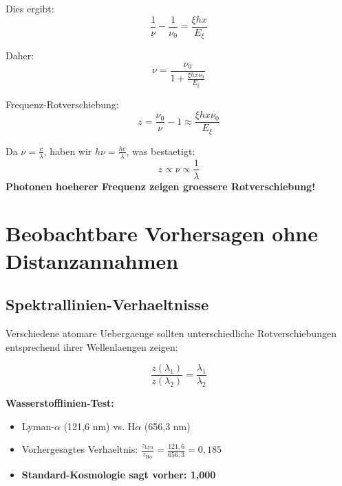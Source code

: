 \documentclass[12pt,a4paper]{article}
\newcommand{\Exi}{E_\xi}
\newcommand{\nuzero}{\nu_0}
\theoremstyle{definition}
\begin{document}
	Dies ergibt:
	\begin{equation}
		\frac{1}{\nu} - \frac{1}{\nuzero} = \frac{\xi h x}{\Exi}
	\end{equation}
	
	Daher:
	\begin{equation}
		\nu = \frac{\nuzero}{1 + \frac{\xi h x \nuzero}{\Exi}}
	\end{equation}
	
	\begin{formel}
		Frequenz-Rotverschiebung:
		\begin{equation}
			z = \frac{\nuzero}{\nu} - 1 \approx \frac{\xi h x \nuzero}{\Exi}
		\end{equation}
	\end{formel}
	
	\begin{wichtig}
		Da $\nu = \frac{c}{\lambda}$, haben wir $h\nu = \frac{hc}{\lambda}$, was bestaetigt:
		\begin{equation}
			z \propto \nu \propto \frac{1}{\lambda}
		\end{equation}
		\textbf{Photonen hoeherer Frequenz zeigen groessere Rotverschiebung!}
	\end{wichtig}
	
	\section{Beobachtbare Vorhersagen ohne Distanzannahmen}
	
	\subsection{Spektrallinien-Verhaeltnisse}
	
	Verschiedene atomare Uebergaenge sollten unterschiedliche Rotverschiebungen entsprechend ihrer Wellenlaengen zeigen:
	
	\begin{equation}
		\frac{z(\lambda_1)}{z(\lambda_2)} = \frac{\lambda_1}{\lambda_2}
	\end{equation}
	
	\begin{experiment}
		\textbf{Wasserstofflinien-Test:}
		\begin{itemize}
			\item Lyman-$\alpha$ (121,6 nm) vs. H$\alpha$ (656,3 nm)
			\item Vorhergesagtes Verhaeltnis: $\frac{z_{\text{Ly}\alpha}}{z_{\text{H}\alpha}} = \frac{121,6}{656,3} = 0,185$
			\item \textbf{Standard-Kosmologie sagt vorher: 1,000}
		\end{itemize}
	\end{experiment}
	
\end{document}
